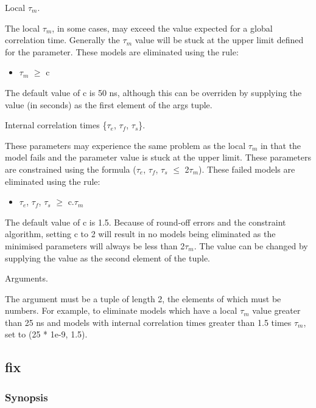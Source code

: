 Local $\tau_m$.

The local $\tau_m$, in some cases, may exceed the value expected for a global correlation time.
Generally the $\tau_m$ value will be stuck at the upper limit defined for the parameter.  These
models are eliminated using the rule:

\begin{itemize}
\item[]     $\tau_m$ $\ge$ c
\end{itemize}

The default value of c is 50 ns, although this can be overriden by supplying the value (in
seconds) as the first element of the args tuple.


Internal correlation times \{$\tau_e$, $\tau_f$, $\tau_s$\}.

These parameters may experience the same problem as the local $\tau_m$ in that the model fails and
the parameter value is stuck at the upper limit.  These parameters are constrained using the
formula ($\tau_e$, $\tau_f$, $\tau_s$ $\le$ 2$\tau_m$).  These failed models are eliminated using the rule:

\begin{itemize}
\item[]     $\tau_e$, $\tau_f$, $\tau_s$ $\ge$ c.$\tau_m$
\end{itemize}

The default value of c is 1.5.  Because of round-off errors and the constraint algorithm,
setting c to 2 will result in no models being eliminated as the minimised parameters will
always be less than 2$\tau_m$.  The value can be changed by supplying the value as the second
element of the tuple.


Arguments.

The 
 argument must be a tuple of length 2, the elements of which must be numbers.  For
example, to eliminate models which have a local $\tau_m$ value greater than 25 ns and models with
internal correlation times greater than 1.5 times $\tau_m$, set 
 to (25 * 1e-9, 1.5).


\newpage

\subsection{fix}


\subsubsection{Synopsis}

